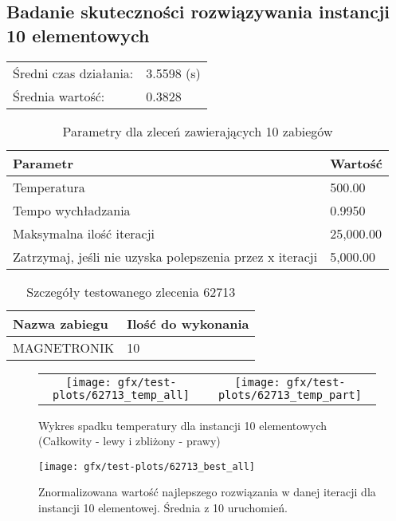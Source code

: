 \subsection{Badanie skuteczności rozwiązywania instancji 10 elementowych}
\begin{table}[H]
\begin{tabular}{ l l }
	Średni czas działania: & 3.5598 (s) \\
Średnia wartość: & 0.3828 \\
\end{tabular}
\end{table}
\begin{table}[H]
\centering
\begin{tabularx}{1\textwidth}{ | l | X | }
\hline
\bfseries Parametr & \bfseries Wartość \\
\hline
Temperatura & 500.00 \\
\hline
Tempo wychładzania & 0.9950 \\
\hline
Maksymalna ilość iteracji & 25,000.00 \\
\hline
Zatrzymaj, jeśli nie uzyska polepszenia przez x iteracji & 5,000.00 \\
\hline
\end{tabularx}
\caption{Parametry dla zleceń zawierających 10 zabiegów}
\end{table}

\begin{table}[H]
\centering
\begin{tabularx}{1\textwidth}{ | X | l | }
\hline
\bfseries Nazwa zabiegu & \bfseries Ilość do wykonania \\
\hline
MAGNETRONIK & 10 \\
\hline
\end{tabularx}
\caption{Szczegóły testowanego zlecenia 62713}
\end{table}
\begin{figure}[H]
\centering
\begin{table}[H]
\centering
\begin{tabularx}{1\textwidth}{ c c }
\texttt{[image: gfx/test-plots/62713\_temp\_all]} & \texttt{[image: gfx/test-plots/62713\_temp\_part]} \\
\end{tabularx}
\end{table}
\caption{Wykres spadku temperatury dla instancji 10 elementowych (Całkowity - lewy i zbliżony - prawy)}
\end{figure}
\begin{figure}[H]
\centering
\texttt{[image: gfx/test-plots/62713\_best\_all]}
\caption{Znormalizowana wartość najlepszego rozwiązania w danej iteracji dla instancji 10 elementowej. Średnia z 10 uruchomień.}
\label{temp-10}
\end{figure}
